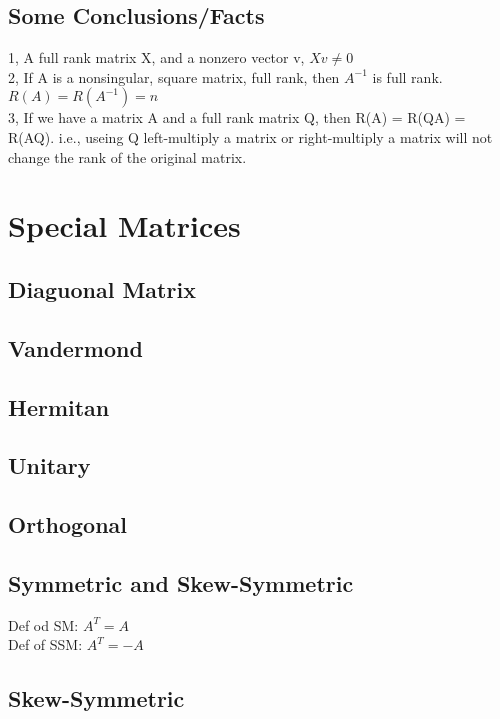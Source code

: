 \documentclass{article}
\begin{document}
\subsection*{Some Conclusions/Facts}
1, A full rank matrix X, and a nonzero vector v, $Xv \neq 0$\\
2, If A is a nonsingular, square matrix, full rank, then $A^{-1}$ is full rank. $R(A) = R(A^{-1})=n$\\
3, If we have a matrix A and a full rank matrix Q, then R(A) = R(QA) = R(AQ). i.e., useing Q left-multiply a matrix
or right-multiply a matrix will not change the rank of the original matrix.\\



\section{Special Matrices}
\subsection*{Diaguonal Matrix}
\subsection*{Vandermond}
\subsection*{Hermitan}
\subsection*{Unitary}
\subsection*{Orthogonal}
\subsection*{Symmetric and Skew-Symmetric}
Def od SM:
$A^T = A$\\

Def of SSM:
$A^T = -A$\\

\subsection*{Skew-Symmetric}
\end{document}
